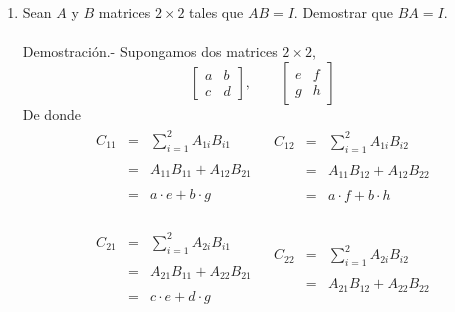 \begin{enumerate}[1.]
    \item Sean $A$ y $B$ matrices $2\times 2$ tales que $AB=I$. Demostrar que $BA=I.$\\\\
	Demostración.-\; Supongamos dos matrices $2\times 2$,
	$$
	\left[\begin{array}{rr}
		a & b\\
		c & d
	    \end{array} 
	\right] ,\qquad 
	\left[
	    \begin{array}{rr}
		e & f\\
		g & h
	    \end{array}
	\right]
	$$
	De donde
	$$
	\begin{array}{c|c}
	    \begin{array}{rcl}
		C_{11} &=& \displaystyle \sum_{i=1}^2 A_{1i}B_{i1}\\\\
		       &=& A_{11}B_{11}+A_{12}B_{21}\\\\
		       &=& a\cdot e + b\cdot g\\\\
	    \end{array}&
	    \begin{array}{rcl}
		C_{12} &=& \displaystyle \sum_{i=1}^2 A_{1i}B_{i2}\\\\
		       &=& A_{11}B_{12}+A_{12}B_{22}\\\\
		       &=& a\cdot f + b\cdot h\\\\
	    \end{array}\\\\
	    \hline
	    \begin{array}{rcl}
		C_{21} &=& \displaystyle \sum_{i=1}^2 A_{2i}B_{i1}\\\\
		       &=& A_{21}B_{11}+A_{22}B_{21}\\\\
		       &=& c\cdot e + d\cdot g\\\\
	    \end{array}&
	    \begin{array}{rcl}
		C_{22} &=& \displaystyle \sum_{i=1}^2 A_{2i}B_{i2}\\\\
		       &=& A_{21}B_{12}+A_{22}B_{22}\\\\

\end{array}
\end{array}$$
\end{enumerate}
